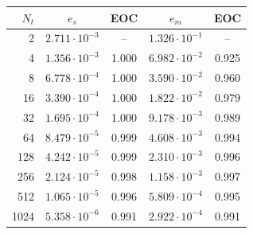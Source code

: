\begin{tabular}{rcccc}
\toprule
$N_t$ & $e_s$ & EOC & $e_m$ & EOC \\
\midrule
2 & $2.711 \cdot 10^{-3}$ & -- & $1.326 \cdot 10^{-1}$ & -- \\
4 & $1.356 \cdot 10^{-3}$ & 1.000 & $6.982 \cdot 10^{-2}$ & 0.925 \\
8 & $6.778 \cdot 10^{-4}$ & 1.000 & $3.590 \cdot 10^{-2}$ & 0.960 \\
16 & $3.390 \cdot 10^{-4}$ & 1.000 & $1.822 \cdot 10^{-2}$ & 0.979 \\
32 & $1.695 \cdot 10^{-4}$ & 1.000 & $9.178 \cdot 10^{-3}$ & 0.989 \\
64 & $8.479 \cdot 10^{-5}$ & 0.999 & $4.608 \cdot 10^{-3}$ & 0.994 \\
128 & $4.242 \cdot 10^{-5}$ & 0.999 & $2.310 \cdot 10^{-3}$ & 0.996 \\
256 & $2.124 \cdot 10^{-5}$ & 0.998 & $1.158 \cdot 10^{-3}$ & 0.997 \\
512 & $1.065 \cdot 10^{-5}$ & 0.996 & $5.809 \cdot 10^{-4}$ & 0.995 \\
1024 & $5.358 \cdot 10^{-6}$ & 0.991 & $2.922 \cdot 10^{-4}$ & 0.991 \\
\bottomrule
\end{tabular}
